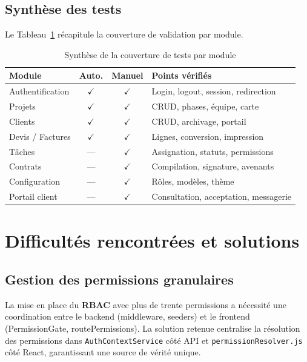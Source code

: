 \subsection{Synthèse des tests}

Le Tableau~\ref{tab:test_summary} récapitule la couverture de validation par module.

\begin{table}[H]
\caption{Synthèse de la couverture de tests par module}
\label{tab:test_summary}
\centering
\small
\begin{tabular}{|l|c|c|p{5.5cm}|}
\hline
\textbf{Module} & \textbf{Auto.} & \textbf{Manuel} & \textbf{Points vérifiés} \\
\hline
Authentification & $\checkmark$ & $\checkmark$ & Login, logout, session, redirection \\
\hline
Projets & $\checkmark$ & $\checkmark$ & CRUD, phases, équipe, carte \\
\hline
Clients & $\checkmark$ & $\checkmark$ & CRUD, archivage, portail \\
\hline
Devis / Factures & $\checkmark$ & $\checkmark$ & Lignes, conversion, impression \\
\hline
Tâches & --- & $\checkmark$ & Assignation, statuts, permissions \\
\hline
Contrats & --- & $\checkmark$ & Compilation, signature, avenants \\
\hline
Configuration & --- & $\checkmark$ & Rôles, modèles, thème \\
\hline
Portail client & --- & $\checkmark$ & Consultation, acceptation, messagerie \\
\hline
\end{tabular}
\end{table}

\section{Difficultés rencontrées et solutions}

\subsection{Gestion des permissions granulaires}

La mise en place du \textbf{RBAC} avec plus de trente permissions a nécessité une
coordination entre le backend (middleware, seeders) et le frontend (PermissionGate,
routePermissions). La solution retenue centralise la résolution des permissions
dans \texttt{AuthContextService} côté API et \texttt{permissionResolver.js} côté
React, garantissant une source de vérité unique.

